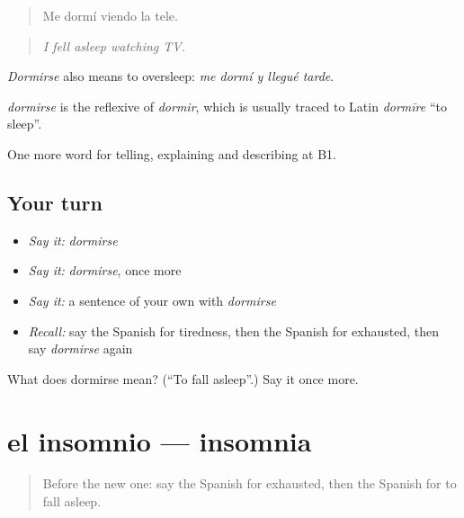 \begin{quote}
Me dormí viendo la tele.
\end{quote}

\begin{quote}
\emph{I fell asleep watching TV.}
\end{quote}

\emph{Dormirse} also means to oversleep: \emph{me dormí y llegué tarde}.

\begin{cousinweb}
\emph{dormirse} is the reflexive of \emph{dormir}, which is usually traced to Latin \emph{dormīre} \textquotedblleft{}to sleep\textquotedblright{}.
\end{cousinweb}

\begin{grammarlens}[title={What you've built}]
One more word for telling, explaining and describing at B1.
\end{grammarlens}

\subsection*{Your turn}
\begin{itemize}
\raggedright
  \item \emph{Say it:} \emph{dormirse}
  \item \emph{Say it:} \emph{dormirse}, once more
  \item \emph{Say it:} a sentence of your own with \emph{dormirse}
  \item \emph{Recall:} say the Spanish for tiredness, then the Spanish for exhausted, then say \emph{dormirse} again
\end{itemize}

\begin{tcolorbox}[breakable,colback=teal!4,colframe=teal!35!black,title={Before you move on}]
What does dormirse mean? (\textquotedblleft{}To fall asleep\textquotedblright{}.) Say it once more.
\end{tcolorbox}
\section[el insomnio]{el insomnio — insomnia}

\label{lesson:ES-C741-insomnio}



\begin{quote}
Before the new one: say the Spanish for exhausted, then the Spanish for to fall asleep.
\end{quote}


